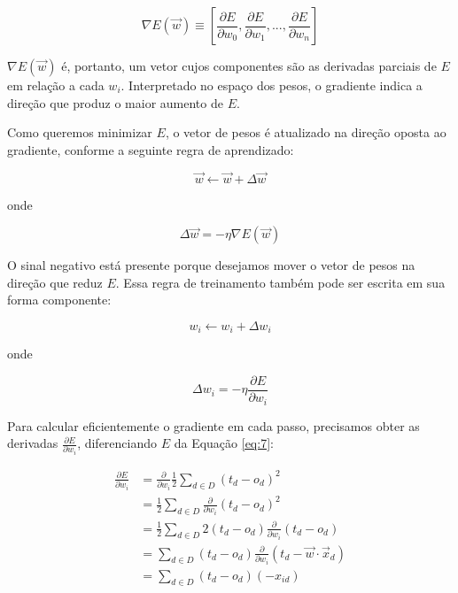 \documentclass{tufte-handout}
\begin{document}
\begin{equation}
\nabla E(\Vec{w}) \equiv
\left[ \frac{\partial E}{\partial w_0}, \frac{\partial E}{\partial w_1}, ..., \frac{\partial E}{\partial w_n} \right]
\end{equation}

$\nabla E(\Vec{w})$ é, portanto, um vetor cujos componentes são as derivadas parciais de $E$ em relação a cada $w_i$. Interpretado no espaço dos pesos, o gradiente indica a direção que produz o maior aumento de $E$.

Como queremos minimizar $E$, o vetor de pesos é atualizado na direção oposta ao gradiente, conforme a seguinte regra de aprendizado:

\begin{equation}
\Vec{w} \leftarrow \Vec{w} + \Delta \Vec{w}
\end{equation}

onde

\begin{equation}
\Delta \Vec{w} = - \eta \nabla E(\Vec{w})
\end{equation}

O sinal negativo está presente porque desejamos mover o vetor de pesos na direção que reduz $E$. Essa regra de treinamento também pode ser escrita em sua forma componente:

\begin{equation}
w_i \leftarrow w_i + \Delta w_i
\end{equation}

onde

\begin{equation}
\Delta w_i = -\eta\frac{\partial E}{\partial w_i}
\end{equation}

Para calcular eficientemente o gradiente em cada passo, precisamos obter as derivadas $\frac{\partial E}{\partial w_i}$, diferenciando $E$ da Equação \ref{eq:7}:

\begin{equation}
    \begin{split}
        \frac{\partial E}{\partial w_i} &= \frac{\partial}{\partial w_i} \frac{1}{2} \sum_{d \in D} (t_d - o_d)^2 \\
        &= \frac{1}{2} \sum_{d \in D} \frac{\partial}{\partial w_i} (t_d - o_d)^2 \\
        &= \frac{1}{2} \sum_{d \in D} 2 (t_d - o_d) \frac{\partial}{\partial w_i} (t_d - o_d) \\
        &= \sum_{d \in D} (t_d - o_d) \frac{\partial}{\partial w_i} (t_d - \vec{w} \cdot \vec{x}_d) \\
        &= \sum_{d \in D} (t_d - o_d)(-x_{id})
    \end{split}
\end{equation}
\end{document}
